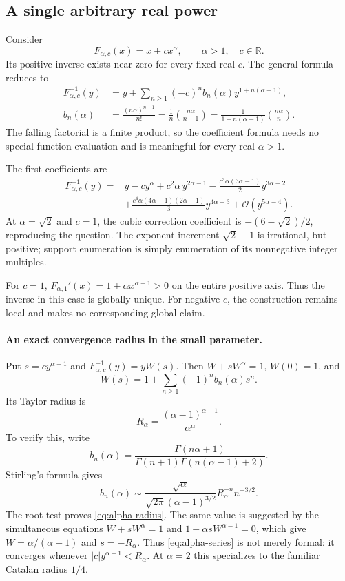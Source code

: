 \documentclass[11pt,a4paper]{article}
\numberwithin{equation}{section}
\theoremstyle{definition}
\newcommand{\R}{\mathbb R}
\newcommand{\OO}{\mathcal O}
\newcommand{\fall}[2]{#1^{\underline{#2}}}
\begin{document}
\subsection{A single arbitrary real power}
Consider
\begin{equation}\label{eq:single-power}
 F_{\alpha,c}(x)=x+c x^\alpha,\qquad \alpha>1,\quad c\in\R.
\end{equation}
Its positive inverse exists near zero for every fixed real $c$.
The general formula reduces to
\begin{align}
 F_{\alpha,c}^{-1}(y)
 &=y+\sum_{n\ge1}(-c)^n b_n(\alpha)
                   y^{1+n(\alpha-1)},\label{eq:alpha-series}\\
 b_n(\alpha)
 &=\frac{\fall{(n\alpha)}{n-1}}{n!}
   =\frac1n\binom{n\alpha}{n-1}
   =\frac1{1+n(\alpha-1)}\binom{n\alpha}{n}.
 \label{eq:alpha-coef}
\end{align}
The falling factorial is a finite product, so the coefficient formula
needs no special-function evaluation and is meaningful for every real
$\alpha>1$.

The first coefficients are
\begin{align*}
 F_{\alpha,c}^{-1}(y)={}&y-cy^\alpha+c^2\alpha\,y^{2\alpha-1}
 -\frac{c^3\alpha(3\alpha-1)}2y^{3\alpha-2}\\
 &+\frac{c^4\alpha(4\alpha-1)(2\alpha-1)}3y^{4\alpha-3}
 +\OO\!\left(y^{5\alpha-4}\right).
\end{align*}
At $\alpha=\sqrt2$ and $c=1$, the cubic correction coefficient is
$-(6-\sqrt2)/2$, reproducing the question. The exponent increment
$\sqrt2-1$ is irrational, but positive; support enumeration is simply
enumeration of its nonnegative integer multiples.

For $c=1$, $F_{\alpha,1}'(x)=1+\alpha x^{\alpha-1}>0$ on the entire
positive axis. Thus the inverse in this case is globally unique. For
negative $c$, the construction remains local and makes no corresponding
global claim.

\paragraph{An exact convergence radius in the small parameter.}
Put $s=c y^{\alpha-1}$ and $F_{\alpha,c}^{-1}(y)=yW(s)$.
Then $W+sW^\alpha=1$, $W(0)=1$, and
\[
 W(s)=1+\sum_{n\ge1}(-1)^n b_n(\alpha)s^n.
\]
Its Taylor radius is
\begin{equation}\label{eq:alpha-radius}
 R_\alpha=\frac{(\alpha-1)^{\alpha-1}}{\alpha^\alpha}.
\end{equation}
To verify this, write
\[
 b_n(\alpha)=\frac{\Gamma(n\alpha+1)}
 {\Gamma(n+1)\Gamma(n(\alpha-1)+2)}.
\]
Stirling's formula gives
\begin{equation}\label{eq:alpha-coef-asymp}
 b_n(\alpha)\sim
 \frac{\sqrt\alpha}{\sqrt{2\pi}(\alpha-1)^{3/2}}
 R_\alpha^{-n}n^{-3/2}.
\end{equation}
The root test proves \eqref{eq:alpha-radius}. The same value is suggested
by the simultaneous equations $W+sW^\alpha=1$ and
$1+\alpha sW^{\alpha-1}=0$, which give
$W=\alpha/(\alpha-1)$ and $s=-R_\alpha$.
Thus \eqref{eq:alpha-series} is not merely formal: it converges whenever
$|c|y^{\alpha-1}<R_\alpha$. At $\alpha=2$ this specializes to the familiar
Catalan radius $1/4$.
\end{document}
